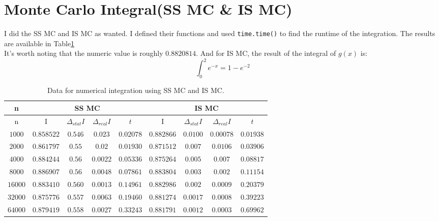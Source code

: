\documentclass[12pt]{article}
\begin{document}
	\section{Monte Carlo Integral(SS MC \& IS MC)}
	I did the SS MC and IS MC as wanted. I defined their functions and used \texttt{time.time()} to find the 
	runtime of the integration. The results are available in Table\ref{tab:MC}\\
	It's worth noting that the numeric value is roughly $0.8820814$. And for IS MC, the result of the integral of $g(x)$ is:\\
	\begin{equation}
		\int_0^2 e^{-x} = 1 - e^{-2}
	\end{equation}
	\begin{table}[h!]
		\centering
		\begin{tabular}{|c|c|c|c|c||c|c|c|c|}
			\hline
			n & \multicolumn{4}{|c||}{SS MC} & \multicolumn{4}{|c|}{IS MC} \\
			\hline
			n & I & $\Delta_{stat} I$ & $\Delta_{real} I$ & $t$ & I & $\Delta_{stat} I$ & $\Delta_{real} I$ & $t$ \\
			\hline
 			$1000$ & $0.858522$ & $0.546$ & $0.023$ & $0.02078$ & $0.882866$ & $0.0100$ & $0.00078$ & $0.01938$ \\
 			\hline
			 $2000$ & $0.861797$ & $0.55$ & $0.02$ & $0.01930$ & $0.871512$ & $0.007$ & $0.0106$ & $0.03906$ \\
			 \hline
			 $4000$ & $0.884244$ & $0.56$ & $0.0022$ & $0.05336$ & $0.875264$ & $0.005$ & $0.007$ & $0.08817$ \\
			 \hline
			 $8000$ & $0.886907$ & $0.56$ & $0.0048$ & $0.07861$ & $0.883804$ & $0.003$ & $0.002$ & $0.11154$ \\
			 \hline
			 $16000$ & $0.883410$ & $0.560$ & $0.0013$ & $0.14961$ & $0.882986$ & $0.002$ & $0.0009$ & $0.20379$ \\
			 \hline
			 $32000$ & $0.875776$ & $0.557$ & $0.0063$ & $0.19460$ & $0.881274$ & $0.0017$ & $0.0008$ & $0.39223$ \\
			 \hline
			 $64000$ & $0.879419$ & $0.558$ & $0.0027$ & $0.33243$ & $0.881791$ & $0.0012$ & $0.0003$ & $0.69962$ \\
			 \hline
		\end{tabular}
	\label{tab:MC}
	\caption{Data for numerical integration using SS MC and IS MC.}	
	\end{table}
\end{document}
